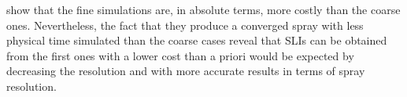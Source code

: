show that the fine simulations are, in absolute terms, more costly than the coarse ones. Nevertheless, the fact that they produce a converged spray with less physical time simulated than the coarse cases reveal that SLIs can be obtained from the first ones with a lower cost than a priori would be expected by decreasing the resolution and with more accurate results in terms of spray resolution. 